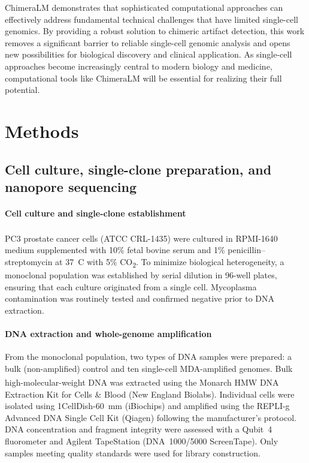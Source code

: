 \documentclass[pdflatex,sn-nature]{sn-jnl}%
\theoremstyle{thmstyleone}%
\theoremstyle{thmstyletwo}%
\theoremstyle{thmstylethree}%
\begin{document}
ChimeraLM demonstrates that sophisticated computational approaches can effectively address fundamental technical challenges that have limited single-cell genomics.
By providing a robust solution to chimeric artifact detection, this work removes a significant barrier to reliable single-cell genomic analysis and opens new possibilities for biological discovery and clinical application.
As single-cell approaches become increasingly central to modern biology and medicine, computational tools like ChimeraLM will be essential for realizing their full potential.

\section*{Methods}\label{sec:methods}

\subsection*{Cell culture, single-clone preparation, and nanopore sequencing}

\paragraph{Cell culture and single-clone establishment}
PC3 prostate cancer cells (ATCC\textsuperscript{\textregistered} CRL-1435\texttrademark) were cultured in RPMI-1640 medium supplemented with 10\% fetal bovine serum and 1\% penicillin--streptomycin at 37~\textdegree C with 5\% CO\textsubscript{2}. To minimize biological heterogeneity, a monoclonal population was established by serial dilution in 96-well plates, ensuring that each culture originated from a single cell. Mycoplasma contamination was routinely tested and confirmed negative prior to DNA extraction.

\paragraph{DNA extraction and whole-genome amplification}
From the monoclonal population, two types of DNA samples were prepared: a bulk (non-amplified) control and ten single-cell MDA-amplified genomes. Bulk high-molecular-weight DNA was extracted using the Monarch\textsuperscript{\textregistered} HMW DNA Extraction Kit for Cells \& Blood (New England Biolabs). Individual cells were isolated using 1CellDish-60~mm (iBiochips) and amplified using the REPLI-g Advanced DNA Single Cell Kit (Qiagen) following the manufacturer's protocol. DNA concentration and fragment integrity were assessed with a Qubit~4 fluorometer and Agilent TapeStation (DNA~1000/5000 ScreenTape). Only samples meeting quality standards were used for library construction.
\end{document}
